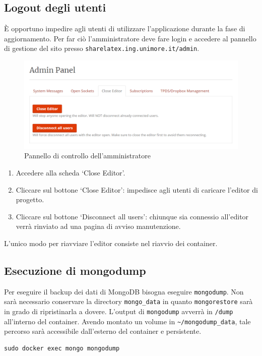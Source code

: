 \subsection{Logout degli utenti}
È opportuno impedire agli utenti di utilizzare l'applicazione durante la fase di aggiornamento. Per far ciò l'amministratore deve fare login e accedere al pannello di gestione del sito presso \verb|sharelatex.ing.unimore.it/admin|.
\begin{figure}[h]
    \centering
    \includegraphics[width=\textwidth]{immagini/close_editor.PNG}
    \caption{Pannello di controllo dell'amministratore}
    \label{fig:close_editor}
\end{figure}
\begin{enumerate}
    \item Accedere alla scheda \enquote*{Close Editor}.
    \item Cliccare sul bottone \enquote*{Close Editor}: impedisce agli utenti di caricare l'editor di progetto.
    \item Cliccare sul bottone \enquote*{Disconnect all users}: chiunque sia connessio all'editor verrà rinviato ad una pagina di avviso manutenzione.
\end{enumerate}
L'unico modo per riavviare l'editor consiste nel riavvio dei container.

\subsection{Esecuzione di mongodump}
Per eseguire il backup dei dati di MongoDB bisogna eseguire \verb|mongodump|. Non sarà necessario conservare la directory \verb|mongo_data| in quanto \verb|mongorestore| sarà in grado di ripristinarla a dovere. L'output di \verb|mongodump| avverrà in \verb|/dump| all'interno del container. Avendo montato un volume in \verb|~/mongodump_data|, tale percorso sarà accessibile dall'esterno del container e persistente.
\begin{lstlisting}
sudo docker exec mongo mongodump
\end{lstlisting}


